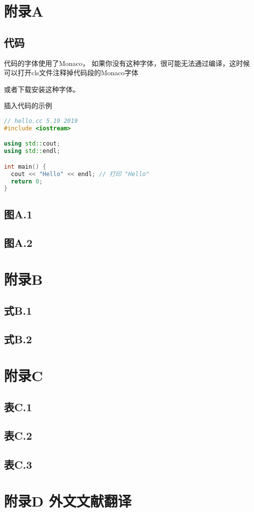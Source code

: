 \appendix
\chapter{附录A}

\section{代码}

代码的字体使用了Monaco， 如果你没有这种字体，很可能无法通过编译，这时候可以打开cls文件注释掉代码段的Monaco字体

或者下载安装这种字体。

插入代码的示例

\begin{lstlisting}[title=代码的名字并且可以删除, language=C++]
// hello.cc 5.19 2019
#include <iostream>

using std::cout;
using std::endl;

int main() {
  cout << "Hello" << endl; // 打印 "Hello"
  return 0;
}

\end{lstlisting}


\section*{图A.1}

\section*{图A.2}

\chapter{附录B}
\section*{式B.1}

\section*{式B.2}

\chapter{附录C}
\section*{表C.1}

\section*{表C.2}

\section*{表C.3}

\chapter{附录D 外文文献翻译}
